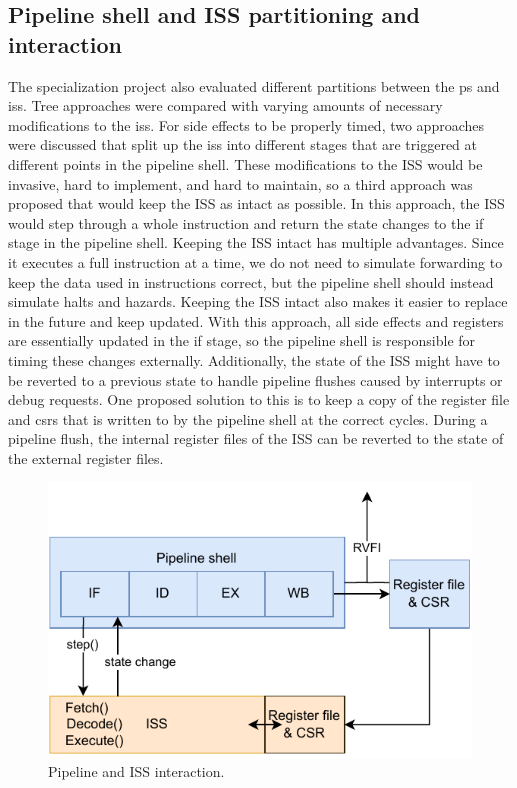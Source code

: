 \subsection{Pipeline shell and ISS partitioning and interaction}
\label{sec:pw_partition}

The specialization project also evaluated different partitions between the \gls{ps} and \acrshort{iss}. Tree approaches were compared with varying amounts of necessary modifications to the \acrshort{iss}. For side effects to be properly timed, two approaches were discussed that split up the \acrshort{iss} into different stages that are triggered at different points in the pipeline shell. These modifications to the ISS would be invasive, hard to implement, and hard to maintain, so a third approach was proposed that would keep the ISS as intact as possible. In this approach, the ISS would step through a whole instruction and return the state changes to the \acrshort{if} stage in the pipeline shell. Keeping the ISS intact has multiple advantages. Since it executes a full instruction at a time, we do not need to simulate forwarding to keep the data used in instructions correct, but the pipeline shell should instead simulate halts and hazards. Keeping the ISS intact also makes it easier to replace in the future and keep updated. With this approach, all side effects and registers are essentially updated in the \acrshort{if} stage, so the pipeline shell is responsible for timing these changes externally. Additionally, the state of the ISS might have to be reverted to a previous state to handle pipeline flushes caused by interrupts or debug requests. One proposed solution to this is to keep a copy of the register file and \acrshort{csr}s that is written to by the pipeline shell at the correct cycles. During a pipeline flush, the internal register files of the ISS can be reverted to the state of the external register files.


\begin{figure}[htb]
    \centering
    \includegraphics[width=0.5\linewidth]{figures/pipeline-iss-3.pdf}
    \caption{Pipeline and ISS interaction.}
    \label{fig:pipeline-iss-3}
\end{figure}

